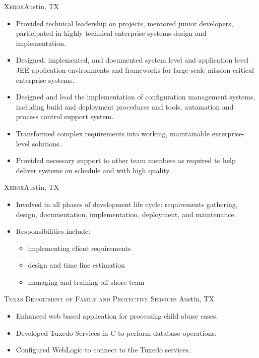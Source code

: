 \documentclass[11pt,letterpaper,sans]{moderncv}
\begin{document}
     {\textsc{Xerox}}{Austin, TX}{}
     {\begin{itemize}
         \item Provided technical leadership on projects, mentored junior 
               developers, participated in highly technical enterprise 
               systems design and implementation.
         \item Designed, implemented, and documented system level and 
               application level JEE application environments and frameworks 
               for large-scale mission critical enterprise systems.
         \item Designed and lead the implementation of configuration 
               management systems, including build and deployment procedures 
               and tools, automation and process control support system.
         \item Transformed complex requirements into working, maintainable 
               enterprise-level solutions.
         \item Provided necessary support to other team members as required 
               to help deliver systems on schedule and with high quality.
     \end{itemize}}
      
     {\textsc{Xerox}}{Austin, TX}{}
     {\begin{itemize}
         \item Involved in all phases of development life cycle:
               requirements gathering, design, documentation,
               implementation, deployment, and maintenance.
         \item Responsibilities include:
               {\begin{itemize}
                   \item implementing client requirements
                   \item design and time line estimation
                   \item managing and training off shore team
               \end{itemize}}
     \end{itemize}}
     
     {\textsc{Texas Department of Family and Protective Services}}
             {Austin, TX}{}
     {\begin{itemize}
         \item Enhanced web based application for processing child
               abuse cases.
         \item Developed Tuxedo Services in C to perform database operations.
         \item Configured WebLogic to connect to the Tuxedo services.
     \end{itemize}}
\end{document}
